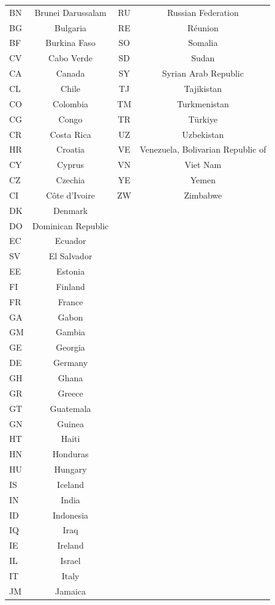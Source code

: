 \documentclass[12pt,a4paper]{article}
\begin{document}
\begin{flushleft}
\begin{longtable}{lccc}
BN & Brunei Darussalam & RU & Russian Federation \\
BG & Bulgaria & RE & Réunion \\
BF & Burkina Faso & SO & Somalia \\
CV & Cabo Verde & SD & Sudan \\
CA & Canada & SY & Syrian Arab Republic \\
CL & Chile & TJ & Tajikistan \\
CO & Colombia & TM & Turkmenistan \\
CG & Congo & TR & Türkiye \\
CR & Costa Rica & UZ & Uzbekistan \\
HR & Croatia & VE & Venezuela, Bolivarian Republic of \\
CY & Cyprus & VN & Viet Nam \\
CZ & Czechia & YE & Yemen \\
CI & Côte d'Ivoire & ZW & Zimbabwe \\
DK & Denmark &  &  \\
DO & Dominican Republic &  &  \\
EC & Ecuador &  &  \\
SV & El Salvador &  &  \\
EE & Estonia &  &  \\
FI & Finland &  &  \\
FR & France &  &  \\
GA & Gabon &  &  \\
GM & Gambia &  &  \\
GE & Georgia &  &  \\
DE & Germany &  &  \\
GH & Ghana &  &  \\
GR & Greece &  &  \\
GT & Guatemala &  &  \\
GN & Guinea &  &  \\
HT & Haiti &  &  \\
HN & Honduras &  &  \\
HU & Hungary &  &  \\
IS & Iceland &  &  \\
IN & India &  &  \\
ID & Indonesia &  &  \\
IQ & Iraq &  &  \\
IE & Ireland &  &  \\
IL & Israel &  &  \\
IT & Italy &  &  \\
JM & Jamaica &  &  \\

\end{longtable}
\end{flushleft}
\end{document}
